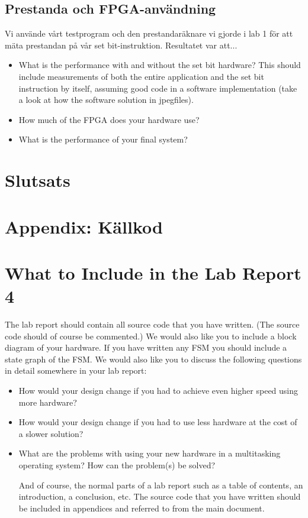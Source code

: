 \documentclass[a4paper]{article}
\begin{document}
\subsection{Prestanda och FPGA-användning}
Vi använde vårt testprogram och den prestandaräknare vi gjorde i lab 1 för att mäta prestandan på
vår set bit-instruktion. Resultatet var att...%

\begin{itemize}
\item What is the performance with and without the set bit hardware? This should include measurements of both the entire application and the set bit instruction by itself, assuming good code in a software implementation (take a look at how the software solution in jpegfiles).
\item How much of the FPGA does your hardware use?
\item What is the performance of your final system?
\end{itemize}

\section{Slutsats}


\section{Appendix: Källkod}


\section{What to Include in the Lab Report 4}
The lab report should contain all source code that you have written. (The source code should of course be commented.) We would also like you to include a block diagram of your hardware. If you have written any FSM you should include a state graph of the FSM.
We would also like you to discuss the following questions in detail somewhere in your lab report:
\begin{itemize}

\item How would your design change if you had to achieve even higher speed using more hardware?
\item How would your design change if you had to use less hardware at the cost of a slower solution?
\item What are the problems with using your new hardware in a multitasking operating system? How can the problem(s) be solved?

And of course, the normal parts of a lab report such as a table of contents, an introduction, a conclusion, etc. The source code that you have written should be included in appendices and referred to from the main document.

\end{itemize}
\end{document}
